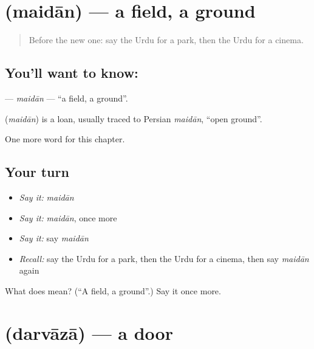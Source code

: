 \section[\texorpdfstring{\ur{میدان} (maidān)}{میدان (maidān)}]{ (maidān) — a field, a ground}

\label{lesson:UR-C101-maidan}



\begin{quote}
Before the new one: say the Urdu for a park, then the Urdu for a cinema.
\end{quote}

\subsection*{You'll want to know: }
\textbf{} — \emph{maidān} — \textquotedblleft{}a field, a ground\textquotedblright{}.

\begin{cousinweb}
\textbf{} (\emph{maidān}) is a loan, usually traced to Persian \emph{maidān}, \textquotedblleft{}open ground\textquotedblright{}.
\end{cousinweb}

\begin{grammarlens}[title={What you've built}]
One more word for this chapter.
\end{grammarlens}

\subsection*{Your turn}
\begin{itemize}
\raggedright
  \item \emph{Say it:} \emph{maidān}
  \item \emph{Say it:} \emph{maidān}, once more
  \item \emph{Say it:} say \emph{maidān}
  \item \emph{Recall:} say the Urdu for a park, then the Urdu for a cinema, then say \emph{maidān} again
\end{itemize}

\begin{tcolorbox}[breakable,colback=teal!4,colframe=teal!35!black,title={Before you move on}]
What does  mean? (\textquotedblleft{}A field, a ground\textquotedblright{}.) Say it once more.
\end{tcolorbox}
\section[\texorpdfstring{\ur{دروازہ} (darvāzā)}{دروازہ (darvāzā)}]{ (darvāzā) — a door}

